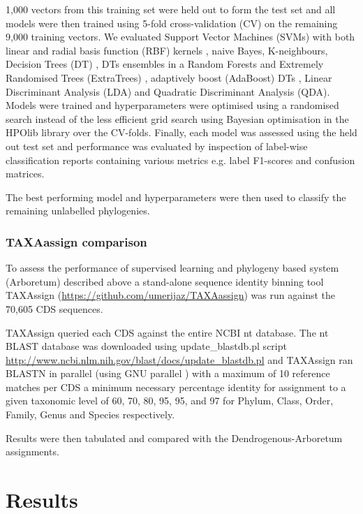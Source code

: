 1,000 vectors from this training set were held out to form the test set and all models were then trained
using 5-fold cross-validation (CV) on the remaining 9,000 training vectors. 
We evaluated Support Vector Machines (SVMs) with both linear and radial basis function (RBF) kernels
\citep{Vapnik1963}, naive Bayes, K-neighbours, 
Decision Trees (DT) \citep{Quinlan1986}, DTs ensembles in a Random Forests \citep{Breiman2001}
and Extremely Randomised Trees (ExtraTrees) \citep{Geurts2006},
adaptively boost (AdaBoost) DTs \citep{Freund1997}, Linear Discriminant Analysis (LDA) and
Quadratic Discriminant Analysis (QDA).
Models were trained and hyperparameters were optimised using a randomised search instead of the less
efficient grid search \citep{Bergstra2012} using Bayesian optimisation in the HPOlib library \citep{Eggensperger2013,Komer2014} over the CV-folds.  
Finally, each model was assessed using the held out test set and performance was 
evaluated by inspection of label-wise classification reports containing various
metrics e.g. label F1-scores and confusion matrices.
 
The best performing model and hyperparameters were then used to classify the remaining
unlabelled phylogenies.

\subsubsection{TAXAassign comparison}

To assess the performance of supervised learning and phylogeny based system (Arboretum)
described above a stand-alone sequence identity binning tool TAXAssign (\url{https://github.com/umerijaz/TAXAassign}) was run 
against the 70,605 CDS sequences.  

TAXAssign queried each CDS against the entire NCBI nt database.
The nt BLAST database was downloaded using update\_blastdb.pl script \url{http://www.ncbi.nlm.nih.gov/blast/docs/update_blastdb.pl}
and TAXAssign ran BLASTN in parallel (using GNU parallel \citep{Tange2011a})
with a maximum of 10 reference matches
per CDS a minimum necessary percentage identity for assignment
to a given taxonomic level of 60, 70, 80, 95, 95, and 97
for Phylum, Class, Order, Family, Genus and Species respectively. 

Results were then tabulated and compared with the Dendrogenous-Arboretum assignments.

\section{Results} 

